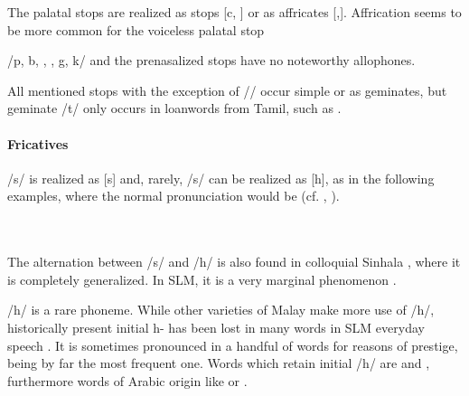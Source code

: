 The palatal stops are    realized as stops [c, \J{}] or as affricates [\textcttctclig,\textctdctzlig]. Affrication seems to be more common for the voiceless palatal stop

/p, b, \dentt, \dentd, g, k/ and the prenasalized stops have no noteworthy allophones.

All mentioned stops with the exception of /\dentd/ occur simple or as geminates, but geminate /t/ only occurs in loanwords from Tamil, such as .
 


\paragraph{Fricatives}
/s/ is realized as [s] and,  rarely, /s/ can be realized as [h], as in the following examples, where the normal pronunciation would be  (cf. \citet[65]{Bichsel}, \citet{SmithEtAl2004}).

\\ 

 \\

The alternation between /s/ and /h/ is also found in colloquial Sinhala \citep[18]{Matzel1983}, where it is completely generalized. In SLM, it is a very marginal phenomenon \citep[cf.][65]{Bichsel}.
 
/h/ is a rare phoneme. While other varieties of Malay make more use of /h/, historically present initial h- has been lost in many words in SLM everyday speech \citep[ch.4.3]{Paauw2004}. It is sometimes pronounced in a handful of words for reasons of prestige,  being by far the most frequent one. Words which retain initial /h/ are  and , furthermore words of Arabic origin like  or .

